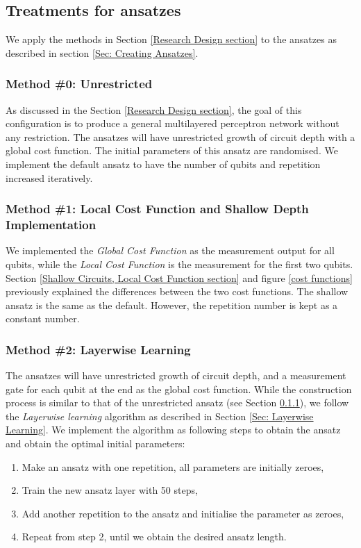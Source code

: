 \subsection{Treatments for ansatzes} \label{Sec: Treatments for ansatzes}

We apply the methods in Section \ref{Research Design section} to the ansatzes as described in section \ref{Sec: Creating Ansatzes}.

\subsubsection{Method \#0: Unrestricted} \label{Sec: Method0}
As discussed in the Section \ref{Research Design section}, the goal of this configuration is to produce a general multilayered perceptron network without any restriction.
The ansatzes will have unrestricted growth of circuit depth with a global cost function.
The initial parameters of this ansatz are randomised.
We implement the default ansatz to have the number of qubits and repetition increased iteratively.

\subsubsection{Method \#1: Local Cost Function and Shallow Depth Implementation} \label{Sec: Method1}
We implemented the \textit{Global Cost Function} as the measurement output for all qubits, while the \textit{Local Cost Function} is the measurement for the first two qubits.
Section \ref{Shallow Circuits, Local Cost Function section} and figure \ref{cost functions} previously explained the differences between the two cost functions.
The shallow ansatz is the same as the default.
However, the repetition number is kept as a constant number.

\subsubsection{Method \#2: Layerwise Learning} \label{Sec: Method2}
The ansatzes will have unrestricted growth of circuit depth, and a measurement gate for each qubit at the end as the global cost function.
While the construction process is similar to that of the unrestricted ansatz (see Section \ref{Sec: Method0}), we follow the \emph{Layerwise learning} algorithm as described in Section \ref{Sec: Layerwise Learning}.
We implement the algorithm as following steps to obtain the ansatz and obtain the optimal initial parameters:
\begin{enumerate}
    \item Make an ansatz with one repetition, all parameters are initially zeroes,
    \item Train the new ansatz layer with 50 steps,
    \item Add another repetition to the ansatz and initialise the parameter as zeroes,
    \item Repeat from step 2, until we obtain the desired ansatz length.
\end{enumerate}

